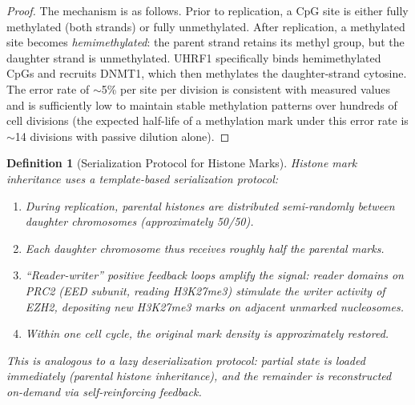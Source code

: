 \documentclass[12pt,a4paper]{article}
\newtheorem{definition}[theorem]{Definition}
\begin{document}
\begin{proof}
The mechanism is as follows. Prior to replication, a CpG site is either fully methylated (both strands) or fully unmethylated. After replication, a methylated site becomes \emph{hemimethylated}: the parent strand retains its methyl group, but the daughter strand is unmethylated. UHRF1 specifically binds hemimethylated CpGs and recruits DNMT1, which then methylates the daughter-strand cytosine. The error rate of $\sim$5\% per site per division is consistent with measured values and is sufficiently low to maintain stable methylation patterns over hundreds of cell divisions (the expected half-life of a methylation mark under this error rate is $\sim$14 divisions with passive dilution alone).
\end{proof}

\begin{definition}[Serialization Protocol for Histone Marks]
\label{def:histone-serial}
Histone mark inheritance uses a \emph{template-based} serialization protocol:
\begin{enumerate}[label=(\roman*)]
    \item During replication, parental histones are distributed semi-randomly between daughter chromosomes (approximately 50/50).
    \item Each daughter chromosome thus receives roughly half the parental marks.
    \item ``Reader-writer'' positive feedback loops amplify the signal: reader domains on PRC2 (EED subunit, reading H3K27me3) stimulate the writer activity of EZH2, depositing new H3K27me3 marks on adjacent unmarked nucleosomes.
    \item Within one cell cycle, the original mark density is approximately restored.
\end{enumerate}
This is analogous to a \emph{lazy deserialization} protocol: partial state is loaded immediately (parental histone inheritance), and the remainder is reconstructed on-demand via self-reinforcing feedback.
\end{definition}
\end{document}
